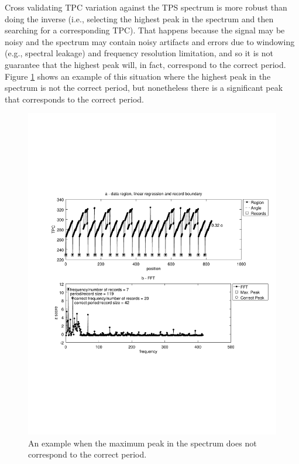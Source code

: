 \documentclass{vldb}
\begin{document}
Cross validating TPC variation against the TPS spectrum is more robust than
doing the inverse (i.e., selecting the highest peak in the spectrum and then
searching for a corresponding TPC). That happens because the signal may be noisy
and the spectrum may contain noisy artifacts and errors due to windowing (e.g.,
spectral leakage) and frequency resolution limitation, and so it is not
guarantee that the highest peak will, in fact, correspond to the correct period.
Figure \ref{fig:fftleak} shows an example of this situation where the highest
peak in the spectrum is not the correct period, but nonetheless there is a
significant peak that corresponds to the correct period.

\begin{figure}[h]
  \centering
     \includegraphics[trim={2.5cm 7.5cm 1cm 6.5cm}, width=\linewidth
     ]{img/fftleak.pdf}
  \caption{An example when the maximum peak in the spectrum does not correspond to the correct period.}
  \label{fig:fftleak}
\end{figure}
\end{document}
